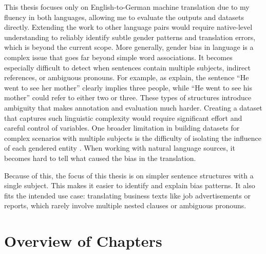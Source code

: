 This thesis focuses only on English-to-German machine translation due to my fluency in both languages, allowing me to evaluate the outputs and datasets directly. Extending the work to other language pairs would require native-level understanding to reliably identify subtle gender patterns and translation errors, which is beyond the current scope. More generally, gender bias in language is a complex issue that goes far beyond simple word associations. It becomes especially difficult to detect when sentences contain multiple subjects, indirect references, or ambiguous pronouns. For example, as \citet{barclayInvestigatingMarkersDrivers2024a} explain, the sentence “He went to see her mother” clearly implies three people, while “He went to see his mother” could refer to either two or three. These types of structures introduce ambiguity that makes annotation and evaluation much harder. Creating a dataset that captures such linguistic complexity would require significant effort and careful control of variables. One broader limitation in building datasets for complex scenarios with multiple subjects is the difficulty of isolating the influence of each gendered entity \citep{lardelliBuildingBridgesDataset2024}. When working with natural language sources, it becomes hard to tell what caused the bias in the translation.

Because of this, the focus of this thesis is on simpler sentence structures with a single subject. This makes it easier to identify and explain bias patterns. It also fits the intended use case: translating business texts like job advertisements or reports, which rarely involve multiple nested clauses or ambiguous pronouns.
 
\section{Overview of Chapters}
